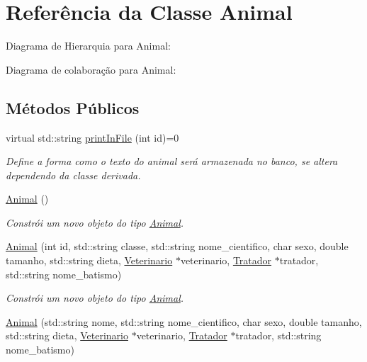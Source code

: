 \hypertarget{classAnimal}{}\section{Referência da Classe Animal}
\label{classAnimal}


Diagrama de Hierarquia para Animal\+:


Diagrama de colaboração para Animal\+:
\subsection*{Métodos Públicos}
\begin{DoxyCompactItemize}
\item 
virtual std\+::string \hyperlink{classAnimal_ac75406040726a6339932d70164cc7242}{print\+In\+File} (int id)=0
\begin{DoxyCompactList}\small\item\em Define a forma como o texto do animal será armazenada no banco, se altera dependendo da classe derivada. \end{DoxyCompactList}\item 
\mbox{\label{classAnimal_a1e726a49ec952443190ac62dad22353c}} 
\hyperlink{classAnimal_a1e726a49ec952443190ac62dad22353c}{Animal} ()
\begin{DoxyCompactList}\small\item\em Constrói um novo objeto do tipo \hyperlink{classAnimal}{Animal}. \end{DoxyCompactList}\item 
\hyperlink{classAnimal_ab045099aad905de0d8c7fbbab296cad6}{Animal} (int id, std\+::string classe, std\+::string nome\+\_\+cientifico, char sexo, double tamanho, std\+::string dieta, \hyperlink{classVeterinario}{Veterinario} $\ast$veterinario, \hyperlink{classTratador}{Tratador} $\ast$tratador, std\+::string nome\+\_\+batismo)
\begin{DoxyCompactList}\small\item\em Constrói um novo objeto do tipo \hyperlink{classAnimal}{Animal}. \end{DoxyCompactList}\item 
\hyperlink{classAnimal_a4e5bbdaad6febb7b024d889dc78c1889}{Animal} (std\+::string nome, std\+::string nome\+\_\+cientifico, char sexo, double tamanho, std\+::string dieta, \hyperlink{classVeterinario}{Veterinario} $\ast$veterinario, \hyperlink{classTratador}{Tratador} $\ast$tratador, std\+::string nome\+\_\+batismo)

\end{DoxyCompactItemize}
